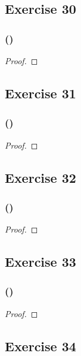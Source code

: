 \documentclass[14pt]{extarticle}
\begin{document}
\subsection{Exercise 30}

\subsubsection{()}

\begin{proof}

\end{proof}

\subsection{Exercise 31}

\subsubsection{()}

\begin{proof}

\end{proof}

\subsection{Exercise 32}

\subsubsection{()}

\begin{proof}

\end{proof}

\subsection{Exercise 33}

\subsubsection{()}

\begin{proof}

\end{proof}

\subsection{Exercise 34}
\end{document}
